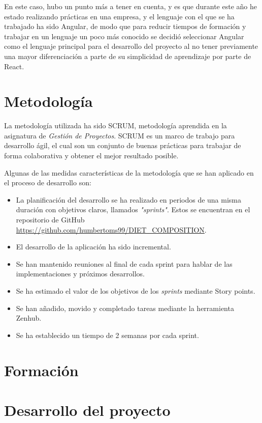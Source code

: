 En este caso, hubo un punto más a tener en cuenta, y es que durante este año he estado realizando prácticas en una empresa, y el lenguaje con el que se ha trabajado ha sido Angular, de modo que para reducir tiempos de formación y trabajar en un lenguaje un poco más conocido se decidió seleccionar Angular como el lenguaje principal para el desarrollo del proyecto al no tener previamente una mayor diferenciación a parte de su simplicidad de aprendizaje por parte de React.

\section{Metodología}

La metodología utilizada ha sido SCRUM, metodología aprendida en la asignatura de \emph{Gestión de Proyectos}. SCRUM es un marco de trabajo para desarrollo ágil, el cual son un conjunto de buenas prácticas para trabajar de forma colaborativa y obtener el mejor resultado  posible.

Algunas de las medidas características de la metodología que se han aplicado en el proceso de desarrollo son:

\begin{itemize}
	\item La  planificación del desarrollo se ha realizado en periodos de una misma duración con objetivos claros, llamados \emph{"sprints"}. Estos se encuentran en el repositorio de GitHub \url{https://github.com/humbertoms99/DIET_COMPOSITION}.
	\item El desarrollo  de la aplicación ha sido incremental.
	\item Se han mantenido reuniones al final de cada sprint para hablar de las implementaciones y próximos desarrollos. 
	\item Se ha estimado el valor de los objetivos de los \emph{sprints}  mediante Story points. 
	\item Se han añadido, movido y completado tareas mediante la herramienta Zenhub.
	\item Se ha establecido un tiempo de 2 semanas por cada sprint.
\end{itemize}

\section{Formación}


\section{Desarrollo del proyecto}

